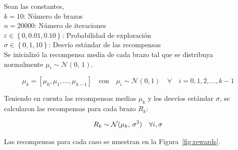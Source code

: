 \documentclass[12pt]{article}
\begin{document}
    Sean las constantes, \\
    $k = 10$: Número de brazos \\
    $n = 20000$: Número de iteraciones \\
    $\varepsilon \in \left\{ 0, 0.01, 0.10 \right\}$: Probabilidad de exploración \\
    $\sigma \in \left\{ 0, 1, 10 \right\}$: Desvío estándar de las recompensas \\

    Se inicializó la recompensa media de cada brazo tal que se distribuya normalmente $\mu_{i} \sim \mathcal{N}(0,\,1)$.

    \[
        \mu_k = \left[ \mu_{0}, \mu_{1}, \ldots, \mu_{k-1} \right] \quad \text{con} \quad \mu_{i} \sim \mathcal{N}(0, 1) \quad \forall \quad i = 0, 1, 2, \ldots, k-1
    \]

    Teniendo en cuenta las recompensas medias $\mu_{k}$ y los desvíos estándar $\sigma$, se calcularon las recompensas para cada brazo $R_{k}$:

    \[
        R_k \sim \mathcal{N}(\mu_k,\,\sigma^{2}) \quad \forall i,\sigma \\
    \]

    Las recompensas para cada caso se muestran en la Figura~\ref{fig:rewards}.
\end{document}
